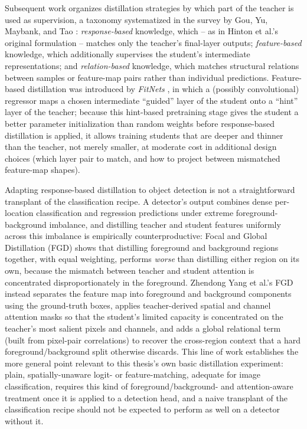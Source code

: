 Subsequent work organizes distillation strategies by which part of the teacher is used as supervision, a taxonomy systematized in the survey by Gou, Yu, Maybank, and Tao \cite{gouKnowledgeDistillationSurvey2021}: \emph{response-based} knowledge, which -- as in Hinton et al.'s original formulation -- matches only the teacher's final-layer outputs; \emph{feature-based} knowledge, which additionally supervises the student's intermediate representations; and \emph{relation-based} knowledge, which matches structural relations between samples or feature-map pairs rather than individual predictions. Feature-based distillation was introduced by \textit{FitNets} \cite{romeroFitNetsHintsThin2015}, in which a (possibly convolutional) regressor maps a chosen intermediate \enquote{guided} layer of the student onto a \enquote{hint} layer of the teacher; because this hint-based pretraining stage gives the student a better parameter initialization than random weights before response-based distillation is applied, it allows training students that are deeper and thinner than the teacher, not merely smaller, at moderate cost in additional design choices (which layer pair to match, and how to project between mismatched feature-map shapes).

Adapting response-based distillation to object detection is not a straightforward transplant of the classification recipe. A detector's output combines dense per-location classification and regression predictions under extreme foreground-background imbalance, and distilling teacher and student features uniformly across this imbalance is empirically counterproductive: Focal and Global Distillation (FGD) \cite{yangFocalGlobalKnowledge2022} shows that distilling foreground and background regions together, with equal weighting, performs \emph{worse} than distilling either region on its own, because the mismatch between teacher and student attention is concentrated disproportionately in the foreground. Zhendong Yang et al.'s FGD instead separates the feature map into foreground and background components using the ground-truth boxes, applies teacher-derived spatial and channel attention masks so that the student's limited capacity is concentrated on the teacher's most salient pixels and channels, and adds a global relational term (built from pixel-pair correlations) to recover the cross-region context that a hard foreground/background split otherwise discards. This line of work establishes the more general point relevant to this thesis's own basic distillation experiment: plain, spatially-unaware logit- or feature-matching, adequate for image classification, requires this kind of foreground/background- and attention-aware treatment once it is applied to a detection head, and a naive transplant of the classification recipe should not be expected to perform as well on a detector without it.

